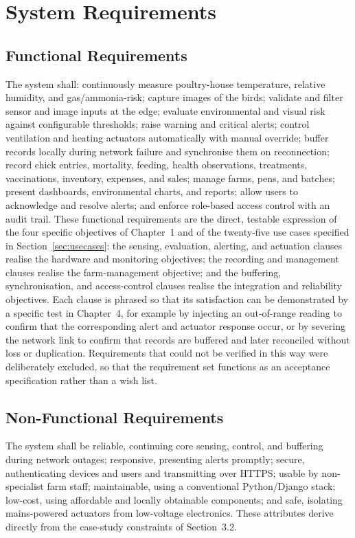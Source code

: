 \documentclass[12pt,a4paper]{report}
\begin{document}
\section{System Requirements}

\subsection{Functional Requirements}

The system shall: continuously measure poultry-house temperature, relative humidity, and gas/ammonia-risk; capture images of the birds; validate and filter sensor and image inputs at the edge; evaluate environmental and visual risk against configurable thresholds; raise warning and critical alerts; control ventilation and heating actuators automatically with manual override; buffer records locally during network failure and synchronise them on reconnection; record chick entries, mortality, feeding, health observations, treatments, vaccinations, inventory, expenses, and sales; manage farms, pens, and batches; present dashboards, environmental charts, and reports; allow users to acknowledge and resolve alerts; and enforce role-based access control with an audit trail. These functional requirements are the direct, testable expression of the four specific objectives of Chapter~1 and of the twenty-five use cases specified in Section~\ref{sec:usecases}: the sensing, evaluation, alerting, and actuation clauses realise the hardware and monitoring objectives; the recording and management clauses realise the farm-management objective; and the buffering, synchronisation, and access-control clauses realise the integration and reliability objectives. Each clause is phrased so that its satisfaction can be demonstrated by a specific test in Chapter~4, for example by injecting an out-of-range reading to confirm that the corresponding alert and actuator response occur, or by severing the network link to confirm that records are buffered and later reconciled without loss or duplication. Requirements that could not be verified in this way were deliberately excluded, so that the requirement set functions as an acceptance specification rather than a wish list.

\subsection{Non-Functional Requirements}

The system shall be reliable, continuing core sensing, control, and buffering during network outages; responsive, presenting alerts promptly; secure, authenticating devices and users and transmitting over HTTPS; usable by non-specialist farm staff; maintainable, using a conventional Python/Django stack; low-cost, using affordable and locally obtainable components; and safe, isolating mains-powered actuators from low-voltage electronics. These attributes derive directly from the case-study constraints of Section~3.2.
\end{document}
